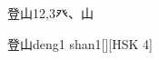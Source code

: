 \begin{entry}{登山}{12,3}{⽨、⼭}
  \begin{phonetics}{登山}{deng1 shan1}[][HSK 4]
  \end{phonetics}
\end{entry}
